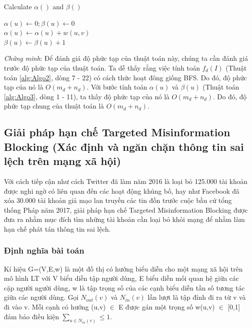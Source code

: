  	\begin{algorithm}[h]
 		\caption{Calculate $\alpha()$ and $\beta()$}
 		\label{alg:Algo3}
 		{
 			$\alpha(u) \gets 0; \beta(u) \gets 0$
 			\\
 			{
 				{
 					$\alpha(u) \gets \alpha(u)+w(u,v)$
 					\\
 					{
 						$\beta(u) \gets \beta(u)+1$
 					}
 				}
 			}
 		}
 	\end{algorithm}
 	
 	{\itshape Chứng minh}: Để đánh giá độ phức tạp của thuật toán này, chúng ta cần đánh giá trước độ phức tạp của thuật toán. Ta dễ thấy rằng việc tính  toán $f_{d}(I)$ (Thuật toán \ref{alg:Algo2}, dòng 7 - 22) có cách thức hoạt đông giống BFS. Do đó, độ phức tạp của nó là $O(m_{d} + n_{d})$. Với bước tính toán $\alpha(u)$ và $\beta(u)$ (Thuật toán \ref{alg:Algo3}, dòng 1 - 11), ta thấy độ phức tạp của nó là $O(m_{d} + n_{d})$. Do đó, độ phức tạp chung của thuật toán là $O(m_{d} + n_{d})$. 
		
	\subsection{Giải pháp hạn chế Targeted Misinformation Blocking (Xác định và ngăn chặn thông tin sai lệch trên mạng xã hội)}
Với cách tiếp cận như cách Twitter đã làm năm 2016 là loại bỏ 125.000 tài khoản được nghi ngờ có liên quan đến các hoạt động khủng bố, hay như Facebook đã xóa 30.000 tài khoản giả mạo lan truyền các tin đồn trước cuộc bầu cử tổng thống Pháp năm 2017, giải pháp hạn chế Targeted Misinformation Blocking được đưa ra nhằm mục đích tìm những tài khoản cần loại bỏ khỏi mạng để nhằm làm hạn chế phát tán thông tin sai lệch.

\subsubsection{Định nghĩa bài toán}
Kí hiệu G=(V,E,w) là một đồ thị có hướng biểu diễn cho một mạng xã hội trên mô hình LT với V biểu diễn tập người dùng, E biểu diễn mối quan hệ giữa các cặp người người dùng, w là tập trọng số của các cạnh biểu diễn tần số tương tác giữa các người dùng. Gọi $N_{out}(v)$ và $N_{in}(v)$ lần lượt là tập đỉnh đi ra từ v và đi vào v. Mỗi cạnh có hướng (u,v) $\in$ E được gán một trọng số w(u,v) $\in$ [0,1] đảm bảo điều kiện $\sum_{u \in N_{in}(v)} \leq 1$.

